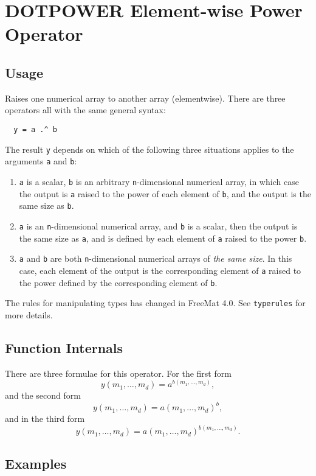 \section{DOTPOWER Element-wise Power Operator}

\subsection{Usage}

Raises one numerical array to another array (elementwise).  There are three operators all with the same general syntax:
\begin{verbatim}
  y = a .^ b
\end{verbatim}
The result \verb|y| depends on which of the following three situations applies to the arguments \verb|a| and \verb|b|:
\begin{enumerate}
  \item \verb|a| is a scalar, \verb|b| is an arbitrary \verb|n|-dimensional numerical array, in which case the output is \verb|a| raised to the power of each element of \verb|b|, and the output is the same size as \verb|b|.
  \item \verb|a| is an \verb|n|-dimensional numerical array, and \verb|b| is a scalar, then the output is the same size as \verb|a|, and is defined by each element of \verb|a| raised to the power \verb|b|.
  \item \verb|a| and \verb|b| are both \verb|n|-dimensional numerical arrays of \emph{the same size}.  In this case, each element of the output is the corresponding element of \verb|a| raised to the power defined by the corresponding element of \verb|b|.
\end{enumerate}

The rules for manipulating types has changed in FreeMat 4.0.  See \verb|typerules|
for more details.

\subsection{Function Internals}

There are three formulae for this operator.  For the first form
\[
y(m_1,\ldots,m_d) = a^{b(m_1,\ldots,m_d)},
\]
and the second form
\[
y(m_1,\ldots,m_d) = a(m_1,\ldots,m_d)^b,
\]
and in the third form
\[
y(m_1,\ldots,m_d) = a(m_1,\ldots,m_d)^{b(m_1,\ldots,m_d)}.
\]
\subsection{Examples}

